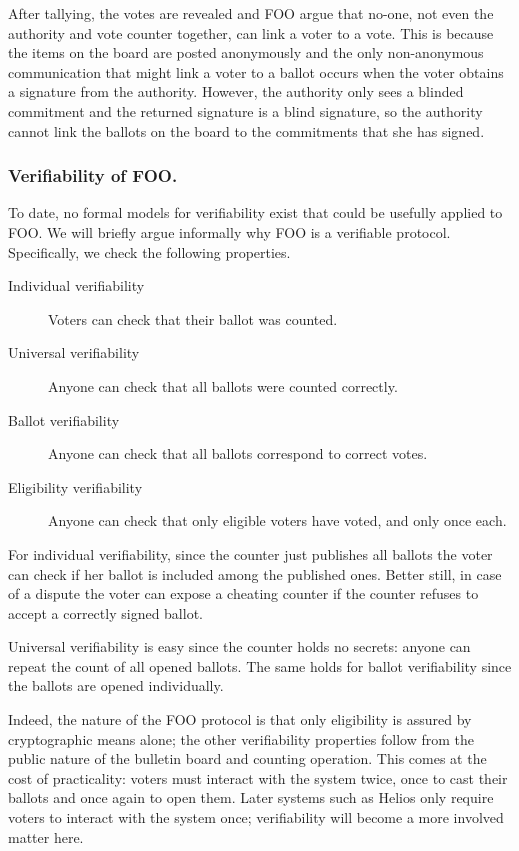 \documentclass[envcountsame]{llncs}
\begin{document}
After tallying, the votes are revealed and FOO argue that no-one, not even the
authority and vote counter together, can link a voter to a vote. This is
because the items on the board are posted anonymously and the only
non-anonymous communication that might link a voter to a ballot occurs when the
voter obtains a signature from the authority. However, the authority only sees
a blinded commitment and the returned signature is a blind signature, so the
authority cannot link the ballots on the board to the commitments that she has
signed.

\subsubsection{Verifiability of FOO.}

To date, no formal models for verifiability exist that could be usefully
applied to FOO.  We will briefly argue informally why FOO is a verifiable
protocol. Specifically, we check the following properties.

\begin{description}
\item[Individual verifiability] Voters can check that their ballot was counted.
\item[Universal verifiability] Anyone can check that all ballots were counted
 correctly.
\item[Ballot verifiability] Anyone can check that all ballots correspond to
 correct votes.
\item[Eligibility verifiability] Anyone can check that only eligible voters have
voted, and only once each.
\end{description}

For individual verifiability, since the counter just publishes all ballots the
voter can check if her ballot is included among the published ones. Better
still, in case of a dispute the voter can expose a cheating counter if the
counter refuses to accept a correctly signed ballot.

Universal verifiability is easy since the counter holds no secrets: anyone can
repeat the count of all opened ballots. The same holds for ballot verifiability
since the ballots are opened individually.

Indeed, the nature of the FOO protocol is that only eligibility is assured by
cryptographic means alone; the other verifiability properties follow from the
public nature of the bulletin board and counting operation. This comes at the
cost of practicality: voters must interact with the system twice, once to cast
their ballots and once again to open them. Later systems such as Helios only
require voters to interact with the system once; verifiability will become a
more involved matter here.
\end{document}
